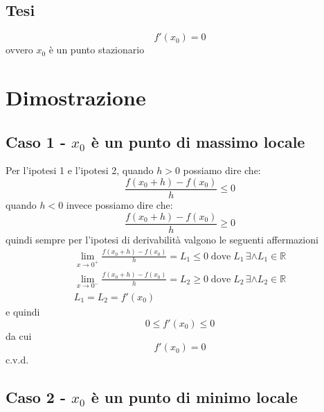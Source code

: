 \documentclass[../../dimostrazioni]{subfiles}
\begin{document}
            \subsection*{Tesi}

                \[f'(x_0) = 0\] ovvero \(x_0\) è un punto stazionario

        \section*{Dimostrazione}

            \medskip

            \subsection*{Caso 1 - \(x_0\) è un punto di massimo locale}

                \smallskip

                Per l'ipotesi 1 e l'ipotesi 2, quando \(h>0\) possiamo dire che:
                \[\frac{f(x_0 + h) - f(x_0)}{h}  \leqslant 0\]
                quando \(h<0\) invece possiamo dire che:
                \[\frac{f(x_0 + h) - f(x_0)}{h}  \geqslant 0\]
                quindi sempre per l'ipotesi di derivabilità valgono le seguenti affermazioni
                \begin{gather*}
                    \lim_{x\to 0^+} \frac{f(x_0 + h) - f(x_0)}{h} = L_1 \leqslant 0 \; \text{dove} \; L_1 \, \exists \land L_1 \in \mathbb{R}\\
                    \lim_{x\to 0^-} \frac{f(x_0 + h) - f(x_0)}{h} = L_2  \geqslant 0 \; \text{dove} \; L_2 \, \exists \land L_2 \in \mathbb{R}\\
                    L_1 = L_2 = f'(x_0)
                \end{gather*}
                e quindi
                \[0 \leqslant f'(x_0) \leqslant 0\]
                da cui
                \[f'(x_0)=0\]
                c.v.d.

            \subsection*{Caso 2 - \(x_0\) è un punto di minimo locale}

                \smallskip
\end{document}

